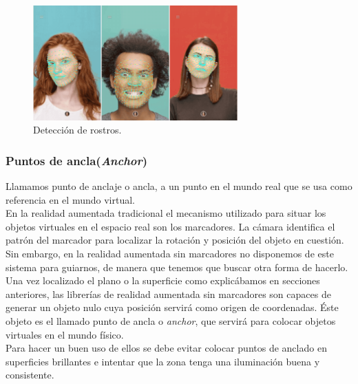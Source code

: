 \begin{figure}[H]
     \centering
     \includegraphics[width=0.7\textwidth]{Images/FaceRecognition.png}
     \caption[Detección de rostros]{Detección de rostros\footnotemark.}
     \label{fig:FaceRecognition}
 \end{figure}
  
\subsubsection{Puntos de ancla(\textit{Anchor})}
Llamamos punto de anclaje o ancla, a un punto en el mundo real que se usa como referencia en el mundo virtual.\\

En la realidad aumentada tradicional el mecanismo utilizado para situar los objetos virtuales en el espacio real son los marcadores. La cámara identifica el patrón del marcador para  localizar la rotación y posición del objeto en cuestión. Sin embargo, en la realidad aumentada sin marcadores no disponemos de este sistema para guiarnos, de manera que tenemos que buscar otra forma de hacerlo.\\

Una vez localizado el plano o la superficie como explicábamos en secciones anteriores, las librerías de realidad aumentada sin marcadores son capaces de generar un objeto nulo cuya posición servirá como origen de coordenadas. Éste objeto es el llamado punto de ancla o \textit{anchor}, que servirá para colocar objetos virtuales en el mundo físico.\\

Para hacer un buen uso de ellos se debe evitar colocar puntos de anclado en superficies brillantes e intentar que la zona tenga una iluminación buena y consistente.


